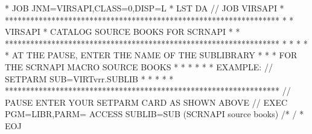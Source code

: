 \documentclass[letterpaper,10pt,english]{sphinxmanual}
\begin{document}
\sphinxAtStartPar
{}

\begin{sphinxVerbatim}[commandchars=\\\{\}]
* \PYGZdl{}\PYGZdl{} JOB JNM=VIRSAPI,CLASS=0,DISP=L
* \PYGZdl{}\PYGZdl{} LST DA
// JOB VIRSAPI
* *****************************************************************
* * VIRSAPI * CATALOG SOURCE BOOKS FOR SCRNAPI                    *
* *****************************************************************
* *                                                               *
* * AT THE PAUSE, ENTER THE NAME OF THE SUB\PYGZhy{}LIBRARY               *
* * FOR THE SCRNAPI MACRO SOURCE BOOKS                            *
* *                                                               *
* * EXAMPLE: // SETPARM SUB=\PYGZsq{}VIRTvrr.SUBLIB\PYGZsq{}                      *
* *                                                               *
* *****************************************************************
// PAUSE ENTER YOUR SETPARM CARD AS SHOWN ABOVE
// EXEC PGM=LIBR,PARM=\PYGZsq{} ACCESS SUBLIB=\PYGZam{}SUB\PYGZsq{}
        (SCRNAPI source books)
/*
/\PYGZam{}
* \PYGZdl{}\PYGZdl{} EOJ
\end{sphinxVerbatim}

\sphinxAtStartPar
{}
\end{document}
